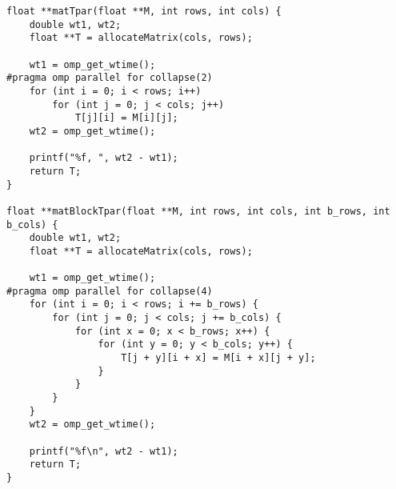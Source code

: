 \begin{code}
    \begin{verbatim}
float **matTpar(float **M, int rows, int cols) {
    double wt1, wt2;
    float **T = allocateMatrix(cols, rows);

    wt1 = omp_get_wtime();
#pragma omp parallel for collapse(2)
    for (int i = 0; i < rows; i++)
        for (int j = 0; j < cols; j++)
            T[j][i] = M[i][j];
    wt2 = omp_get_wtime();

    printf("%f, ", wt2 - wt1);
    return T;
}

float **matBlockTpar(float **M, int rows, int cols, int b_rows, int b_cols) {
    double wt1, wt2;
    float **T = allocateMatrix(cols, rows);

    wt1 = omp_get_wtime();
#pragma omp parallel for collapse(4)
    for (int i = 0; i < rows; i += b_rows) {
        for (int j = 0; j < cols; j += b_cols) {
            for (int x = 0; x < b_rows; x++) {
                for (int y = 0; y < b_cols; y++) {
                    T[j + y][i + x] = M[i + x][j + y];
                }
            }
        }
    }
    wt2 = omp_get_wtime();

    printf("%f\n", wt2 - wt1);
    return T;
}
    \end{verbatim}
\end{code}
